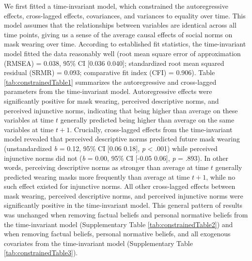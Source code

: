 \documentclass[
  man, donotrepeattitle,floatsintext]{apa6}
\begin{document}
We first fitted a time-invariant model, which constrained the autoregressive effects, cross-lagged effects, covariances, and variances to equality over time. This model assumes that the relationships between variables are identical across all time points, giving us a sense of the average causal effects of social norms on mask wearing over time. According to established fit statistics, the time-invariant model fitted the data reasonably well (root mean square error of approximation (RMSEA) = 0.038, 95\% CI {[}0.036 0.040{]}; standardized root mean squared residual (SRMR) = 0.093; comparative fit index (CFI) = 0.906). Table \ref{tab:constrainedTable1} summarizes the autoregressive and cross-lagged parameters from the time-invariant model. Autoregressive effects were significantly positive for mask wearing, perceived descriptive norms, and perceived injunctive norms, indicating that being higher than average on these variables at time \(t\) generally predicted being higher than average on the same variables at time \(t + 1\). Crucially, cross-lagged effects from the time-invariant model revealed that perceived descriptive norms predicted future mask wearing (unstandardized \emph{b} = 0.12, 95\% CI {[}0.06 0.18{]}, \emph{p} \textless{} .001) while perceived injunctive norms did not (\emph{b} = 0.00, 95\% CI {[}-0.05 0.06{]}, \emph{p} = .893). In other words, perceiving descriptive norms as stronger than average at time \(t\) generally predicted wearing masks more frequently than average at time \(t + 1\), while no such effect existed for injunctive norms. All other cross-lagged effects between mask wearing, perceived descriptive norms, and perceived injunctive norms were significantly positive in the time-invariant model. This general pattern of results was unchanged when removing factual beliefs and personal normative beliefs from the time-invariant model (Supplementary Table \ref{tab:constrainedTable2}) and when removing factual beliefs, personal normative beliefs, and all exogenous covariates from the time-invariant model (Supplementary Table \ref{tab:constrainedTable3}).
\end{document}
